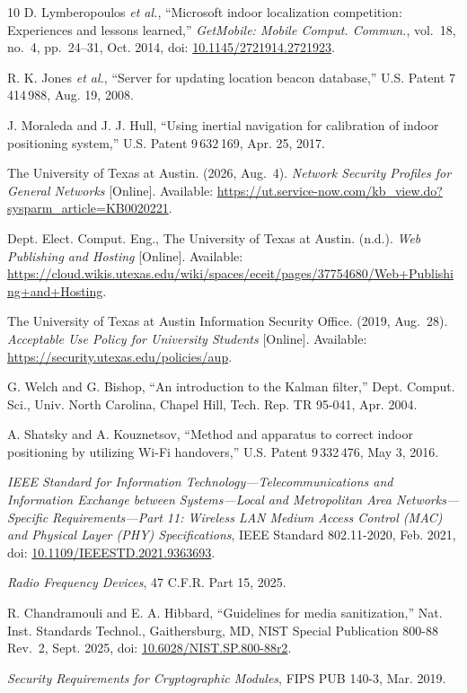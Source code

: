 \documentclass[12pt,letterpaper]{article}
\begin{document}
\begin{thebibliography}{10}
D. Lymberopoulos \emph{et al.}, ``Microsoft indoor localization competition: Experiences and
lessons learned,'' \emph{GetMobile: Mobile Comput. Commun.}, vol.~18, no.~4, pp.~24--31, Oct. 2014,
doi: \url{10.1145/2721914.2721923}.

R. K. Jones \emph{et al.}, ``Server for updating location beacon database,'' U.S. Patent
7\,414\,988, Aug. 19, 2008.

J. Moraleda and J. J. Hull, ``Using inertial navigation for calibration of indoor positioning
system,'' U.S. Patent 9\,632\,169, Apr. 25, 2017.

The University of Texas at Austin. (2026, Aug.~4). \emph{Network Security Profiles for General
Networks} [Online]. Available: \url{https://ut.service-now.com/kb_view.do?sysparm_article=KB0020221}.

Dept. Elect. Comput. Eng., The University of Texas at Austin. (n.d.). \emph{Web Publishing and
Hosting} [Online]. Available:
\url{https://cloud.wikis.utexas.edu/wiki/spaces/eceit/pages/37754680/Web+Publishing+and+Hosting}.

The University of Texas at Austin Information Security Office. (2019, Aug.~28). \emph{Acceptable
Use Policy for University Students} [Online]. Available:
\url{https://security.utexas.edu/policies/aup}.

G. Welch and G. Bishop, ``An introduction to the Kalman filter,'' Dept. Comput. Sci., Univ. North
Carolina, Chapel Hill, Tech. Rep. TR 95-041, Apr. 2004.

A. Shatsky and A. Kouznetsov, ``Method and apparatus to correct indoor positioning by utilizing
Wi-Fi handovers,'' U.S. Patent 9\,332\,476, May 3, 2016.

\emph{IEEE Standard for Information Technology---Telecommunications and Information Exchange
between Systems---Local and Metropolitan Area Networks---Specific Requirements---Part 11:
Wireless LAN Medium Access Control (MAC) and Physical Layer (PHY) Specifications}, IEEE Standard
802.11-2020, Feb. 2021, doi: \url{10.1109/IEEESTD.2021.9363693}.

\emph{Radio Frequency Devices}, 47 C.F.R. Part 15, 2025.

R. Chandramouli and E. A. Hibbard, ``Guidelines for media sanitization,'' Nat. Inst. Standards
Technol., Gaithersburg, MD, NIST Special Publication 800-88 Rev.~2, Sept. 2025,
doi: \url{10.6028/NIST.SP.800-88r2}.

\emph{Security Requirements for Cryptographic Modules}, FIPS PUB 140-3, Mar. 2019.
\end{thebibliography}
\endgroup
\end{document}
